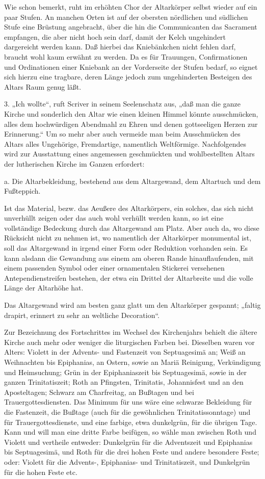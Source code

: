 Wie schon bemerkt, ruht im erhöhten Chor der Altarkörper selbst wieder auf ein paar Stufen. An manchen Orten ist auf der obersten nördlichen und südlichen Stufe eine Brüstung angebracht, über die hin die Communicanten das Sacrament empfangen, die aber nicht hoch sein darf, damit der Kelch ungehindert dargereicht werden kann. Daß hierbei das Kniebänkchen nicht fehlen darf, braucht wohl kaum erwähnt zu werden. Da es für Trauungen, Confirmationen und Ordinationen einer Kniebank an der Vorderseite der Stufen bedarf, so eignet sich hierzu eine tragbare, deren Länge jedoch zum ungehinderten Besteigen des Altars Raum genug läßt.

3. „Ich wollte“, ruft Scriver in seinem Seelenschatz aus, „daß man die ganze Kirche und sonderlich den Altar wie einen kleinen Himmel könnte ausschmücken, alles dem hochwürdigen Abendmahl zu Ehren und denen gottseeligen Herzen zur Erinnerung.“ Um so mehr aber auch vermeide man beim Ausschmücken des Altars alles Ungehörige, Fremdartige, namentlich Weltförmige. Nachfolgendes wird zur Ausstattung eines angemessen geschmückten und wohlbestellten Altars der lutherischen Kirche im Ganzen erfordert:

a. Die Altarbekleidung, bestehend aus dem Altargewand, dem Altartuch und dem Fußteppich.

Ist das Material, bezw. das Aeußere des Altarkörpers, ein solches, das sich nicht unverhüllt zeigen oder das auch wohl verhüllt werden kann, so ist eine vollständige Bedeckung durch das Altargewand am Platz. Aber auch da, wo diese Rücksicht nicht zu nehmen ist, wo namentlich der Altarkörper monumental ist, soll das Altargewand in irgend einer Form oder Reduktion vorhanden sein. Es kann alsdann die Gewandung aus einem am oberen Rande hinauflaufenden, mit einem passenden Symbol oder einer ornamentalen Stickerei versehenen Antependienstreifen bestehen, der etwa ein Drittel der Altarbreite und die volle Länge der Altarhöhe hat.

Das Altargewand wird am besten ganz glatt um den Altarkörper gespannt; „faltig drapirt, erinnert zu sehr an weltliche Decoration“.

Zur Bezeichnung des Fortschrittes im Wechsel des Kirchenjahrs behielt die ältere Kirche auch mehr oder weniger die liturgischen Farben bei. Dieselben
waren vor Alters: Violett in der Advents- und Fastenzeit von Septuagesimä an; Weiß an Weihnachten bis Epiphanias, an Ostern, sowie an Mariä Reinigung, Verkündigung und Heimsuchung; Grün in der Epiphaniaszeit bis Septuagesimä, sowie in der ganzen Trinitatiszeit; Roth an Pfingsten, Trinitatis, Johannisfest und an den Aposteltagen; Schwarz am Charfreitag, an Bußtagen und bei Trauergottesdiensten. Das Minimum für uns wäre eine schwarze Bekleidung für die Fastenzeit, die Bußtage (auch für die gewöhnlichen Trinitatissonntage) und für Trauergottesdienste, und eine farbige, etwa dunkelgrün, für die übrigen Tage. Kann und will man eine dritte Farbe beifügen, so wähle man zwischen Roth und Violett und vertheile entweder: Dunkelgrün für die Adventszeit und Epiphanias bis Septuagesimä, und Roth für die drei hohen Feste und andere besondere Feste; oder: Violett für die Advents-, Epiphanias- und Trinitatiszeit, und Dunkelgrün für die hohen Feste etc.

